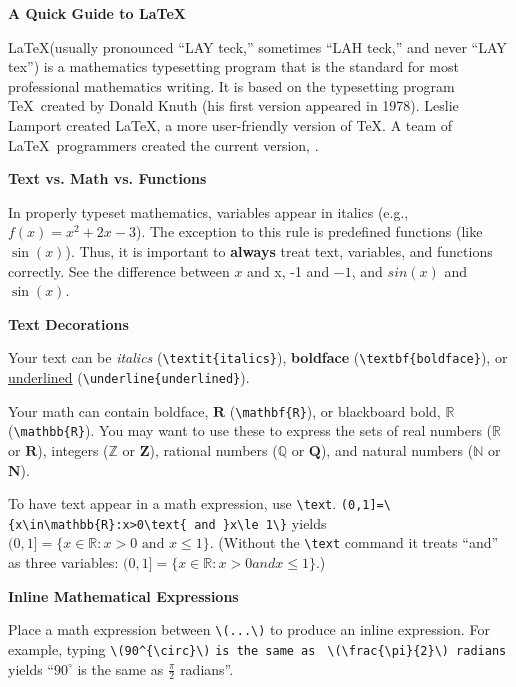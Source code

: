 \documentclass[10pt,landscape]{article}
\newcommand{\ColorSection}[1]{\par\vspace{1.5ex}\noindent\textcolor{sectioncolor}{\Large\bfseries #1}\par\vspace{0.75ex}}
\newcommand{\ColorSubsection}[1]{\par\vspace{1ex}\noindent\textcolor{subsectioncolor}{\normalsize\bfseries #1}\par\vspace{0.5ex}}
\begin{document}
\raggedright
\footnotesize


\begin{center}
\textcolor{titlecolor}{\Huge\bfseries A Quick Guide to \LaTeX}
\end{center}
\begin{multicols}{3}
\setlength{\premulticols}{1pt}
\setlength{\postmulticols}{1pt}
\setlength{\multicolsep}{1pt}
\setlength{\columnsep}{2pt}


\begin{tcolorbox}[notebox, title=What is \LaTeX?]
\LaTeX (usually pronounced ``LAY teck,'' sometimes ``LAH teck,'' and never ``LAY tex'') is a mathematics typesetting program that is the standard for most professional mathematics writing. It is based on the typesetting program \TeX\ created by Donald Knuth (his first version appeared in 1978). Leslie Lamport created \LaTeX, a more user-friendly version of \TeX. A team of \LaTeX\ programmers created the current version,  \LaTeXe.
\end{tcolorbox}



\ColorSection{Text vs. Math vs. Functions}
In properly typeset mathematics, variables appear in italics (e.g., \(f(x)=x^{2}+2x-3\)). The exception to this rule is predefined functions (like \(\sin (x)\)). Thus, it is important to \textbf{always} treat text, variables, and functions correctly. See the difference between \(x\) and x, -1 and \(-1\), and \(sin(x)\) and \(\sin(x)\).  

\ColorSubsection{Text Decorations}
Your text can be \textit{italics} (\verb!\textit{italics}!), \textbf{boldface} (\verb!\textbf{boldface}!), or \underline{underlined} (\verb!\underline{underlined}!).

Your math can contain boldface, \(\mathbf{R}\) (\verb!\mathbf{R}!), or blackboard bold, \(\mathbb{R}\) (\verb!\mathbb{R}!). You may want to use these to express the sets of real numbers (\(\mathbb{R}\) or \(\mathbf{R}\)), integers (\(\mathbb{Z}\) or \(\mathbf{Z}\)), rational numbers (\(\mathbb{Q}\) or \(\mathbf{Q}\)), and natural numbers (\(\mathbb{N}\) or \(\mathbf{N}\)).

To have text appear in a math expression, use \verb!\text!. \verb!(0,1]=\{x\in\mathbb{R}:x>0\text{ and }x\le 1\}! yields \((0,1]=\{x\in\mathbb{R}:x>0\text{ and }x\le 1\}\). (Without the \verb!\text! command it treats ``and'' as three variables: \((0,1]=\{x\in\mathbb{R}:x>0 and x\le 1\}\).)

\ColorSubsection{Inline Mathematical Expressions}
Place a math expression between \verb!\(...\)! to produce an inline expression.  For example, typing \verb!\(90^{\circ}\)! \texttt{is the same as } \verb!\(\frac{\pi}{2}\) radians!  yields ``\(90^{\circ}\) is the same as \(\frac{\pi}{2}\) radians''.


\end{multicols}
\end{document}
